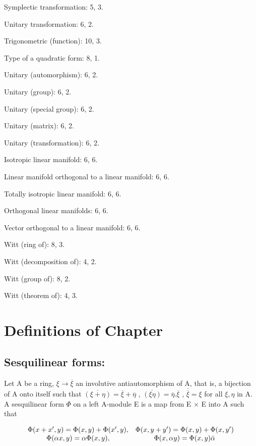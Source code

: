 Symplectic transformation: 5, 3.

Unitary transformation: 6, 2.

Trigonometric (function): 10, 3.

Type of a quadratic form: 8, 1.

Unitary (automorphism): 6, 2.

Unitary (group): 6, 2.

Unitary (special group): 6, 2.

Unitary (matrix): 6, 2.

Unitary (transformation): 6, 2.

Isotropic linear manifold: 6, 6.

Linear manifold orthogonal to a linear manifold: 6, 6.

Totally isotropic linear manifold: 6, 6.

Orthogonal linear manifolds: 6, 6.

Vector orthogonal to a linear manifold: 6, 6.

Witt (ring of): 8, 3.

Witt (decomposition of): 4, 2.

Witt (group of): 8, 2.

Witt (theorem of): 4, 3.

\chapter*{\texorpdfstring{Definitions of Chapter }{Definitions of Chapter IX}}
{}

\section*{Sesquilinear forms:}

Let A be a ring, \(\xi \to \overline{\xi}\) an involutive antiautomorphism of A, that is, a bijection of A onto itself such that \(\overline{(\xi + \eta)} = \overline{\xi} + \overline{\eta}\) , \(\overline{(\xi\eta)} = \overline{\eta} . \overline{\xi}\) , \(\overline{\overline{\xi}} = \xi\) for all \(\xi, \eta\) in A. A sesquilinear form \(\Phi\) on a left A-module E is a map from E × E into A such that

\[
\begin{array}{c c} \Phi (x + x ^ {\prime}, y) = \Phi (x, y) + \Phi (x ^ {\prime}, y), & \Phi (x, y + y ^ {\prime}) = \Phi (x, y) + \Phi (x, y ^ {\prime}) \\ \Phi (\alpha x, y) = \alpha \Phi (x, y), & \Phi (x, \alpha y) = \Phi (x, y) \bar {\alpha} \end{array}
\]

